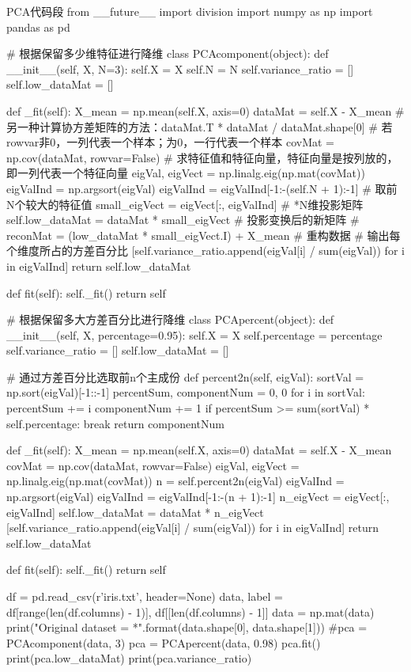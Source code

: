 \documentclass[openbib]{article}
\begin{document}
\begin{Python}{PCA代码段}
from __future__ import division
import numpy as np
import pandas as pd

# 根据保留多少维特征进行降维
class PCAcomponent(object):
	def __init__(self, X, N=3):
		self.X = X
		self.N = N
		self.variance_ratio = []
		self.low_dataMat = []

	def _fit(self):
		X_mean = np.mean(self.X, axis=0)
		dataMat = self.X - X_mean
		# 另一种计算协方差矩阵的方法：dataMat.T * dataMat / dataMat.shape[0]
		# 若rowvar非0，一列代表一个样本；为0，一行代表一个样本
		covMat = np.cov(dataMat, rowvar=False)
		# 求特征值和特征向量，特征向量是按列放的，即一列代表一个特征向量
		eigVal, eigVect = np.linalg.eig(np.mat(covMat))
		eigValInd = np.argsort(eigVal)
		eigValInd = eigValInd[-1:-(self.N + 1):-1]  # 取前N个较大的特征值
		small_eigVect = eigVect[:, eigValInd]  # *N维投影矩阵
		self.low_dataMat = dataMat * small_eigVect  # 投影变换后的新矩阵
		# reconMat = (low_dataMat * small_eigVect.I) + X_mean  # 重构数据
		# 输出每个维度所占的方差百分比
		[self.variance_ratio.append(eigVal[i] / sum(eigVal)) for i in eigValInd]
		return self.low_dataMat

	def fit(self):
		self._fit()
		return self


# 根据保留多大方差百分比进行降维
class PCApercent(object):
	def __init__(self, X, percentage=0.95):
		self.X = X
		self.percentage = percentage
		self.variance_ratio = []
		self.low_dataMat = []

# 通过方差百分比选取前n个主成份
	def percent2n(self, eigVal):
		sortVal = np.sort(eigVal)[-1::-1]
		percentSum, componentNum = 0, 0
		for i in sortVal:
			percentSum += i
			componentNum += 1
			if percentSum >= sum(sortVal) * self.percentage:
				break
		return componentNum

	def _fit(self):
		X_mean = np.mean(self.X, axis=0)
		dataMat = self.X - X_mean
		covMat = np.cov(dataMat, rowvar=False)
		eigVal, eigVect = np.linalg.eig(np.mat(covMat))
		n = self.percent2n(eigVal)
		eigValInd = np.argsort(eigVal)
		eigValInd = eigValInd[-1:-(n + 1):-1]
		n_eigVect = eigVect[:, eigValInd]
		self.low_dataMat = dataMat * n_eigVect
		[self.variance_ratio.append(eigVal[i] / sum(eigVal)) for i in eigValInd]
		return self.low_dataMat

	def fit(self):
		self._fit()
		return self

df = pd.read_csv(r'iris.txt', header=None)
data, label = df[range(len(df.columns) - 1)], df[[len(df.columns) - 1]]
data = np.mat(data)
print("Original dataset = {}*{}".format(data.shape[0], data.shape[1]))
#pca = PCAcomponent(data, 3)
pca = PCApercent(data, 0.98)
pca.fit()
print(pca.low_dataMat)
print(pca.variance_ratio)
\end{Python}
\end{document}
